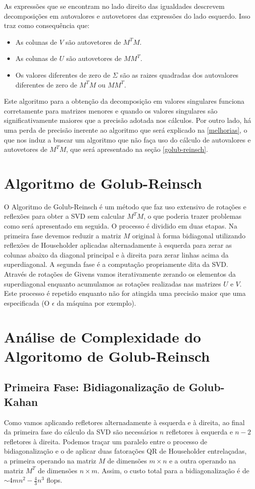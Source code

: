 \documentclass[brazil,times]{abnt}
\begin{document}
		As expressões que se encontram no lado direito das igualdades descrevem decomposições em autovalores e autovetores das expressões do lado esquerdo. Isso traz como consequência que:
		
		\begin{itemize}
			\item As colunas de $V$ são autovetores de $M^{T}M$.
			\item As colunas de $U$ são autovetores de $MM^{T}$.
			\item Os valores diferentes de zero de $\Sigma$ são as raizes quadradas dos autovalores diferentes de zero de $M^{T}M$ ou $MM^{T}$.
		\end{itemize}
		
		Este algoritmo para a obtenção da decomposição em valores singulares funciona corretamente para matrizes menores e quando os valores singulares são significativamente maiores que a precisão adotada nos cálculos. Por outro lado, há uma perda de precisão inerente ao algoritmo que será explicado na \ref{melhorias}, o que nos induz a buscar um algoritmo que não faça uso do cálculo de autovalores e autovetores de $M^{T}M$, que será apresentado na seção \ref{golub-reinsch}.

	\section{Algoritmo de Golub-Reinsch\label{golub-reinsch}}
		O Algoritmo de Golub-Reinsch é um método que faz uso extensivo de rotações e reflexões para obter a SVD sem calcular $M^{T}M$, o que poderia trazer problemas como será apresentado em seguida.
		O processo é dividido em duas etapas. Na primeira fase devemos reduzir a matriz $M$ original à forma bidiagonal utilizando reflexões de Householder aplicadas alternadamente à esquerda para zerar as colunas abaixo da diagonal principal e à direita para zerar linhas acima da superdiagonal.
		A segunda fase é a computação propriamente dita da SVD. Através de rotações de Givens vamos iterativamente zerando os elementos da superdiagonal enquanto acumulamos as rotações realizadas nas matrizes $U$ e $V$. Este processo é repetido enquanto não for atingida uma precisão maior que uma especificada (O $\epsilon$ da máquina por exemplo). 
		
	\section{Análise de Complexidade do Algoritomo de Golub-Reinsch}
		\subsection{Primeira Fase: Bidiagonalização de Golub-Kahan}
			Como vamos aplicando refletores alternadamente à esquerda e à direita, ao final da primeira fase do cálculo da SVD são necessários $n$ refletores à esquerda e $n - 2$ refletores à direita. Podemos traçar um paralelo entre o processo de bidiagonalização e o de aplicar duas fatorações QR de Householder entrelaçadas, a primeira operando na matriz $M$ de dimensões $m \times n$ e a outra operando na matriz $M^{T}$ de dimensões $n \times m$. Assim, o custo total para a bidiagonalização é de $\sim 4mn^2 - \frac{4}{3}n^3$ flops. \cite{trefethen}
\end{document}
